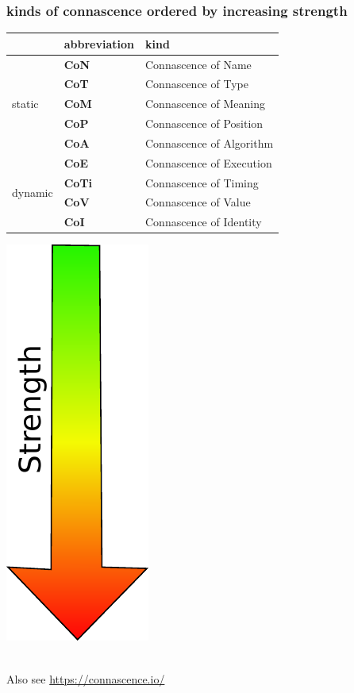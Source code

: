\documentclass[aspectratio=169,12pt,xcolor=dvipsnames]{beamer}
\begin{document}
\begin{frame}
  \frametitle{kinds of connascence ordered by increasing strength}
  \begin{center}
    \begin{minipage}[c]{.75\textwidth}
      \begin{tabular}{|l|l|l|}\hline
        & \textbf{abbreviation}  & \textbf{kind} \\\hline
        \multirow{5}{*}{static}  & \textbf{CoN}  & Connascence of Name\\
        & \textbf{CoT}  & Connascence of Type\\
        & \textbf{CoM}  & Connascence of Meaning\\
        & \textbf{CoP}  & Connascence of Position\\
        & \textbf{CoA}  & Connascence of Algorithm\\\hline
        \multirow{4}{*}{dynamic} & \textbf{CoE}  & Connascence of Execution\\
        & \textbf{CoTi} & Connascence of Timing\\
        & \textbf{CoV}  & Connascence of Value\\
        & \textbf{CoI}  & Connascence of Identity\\\hline
      \end{tabular}
    \end{minipage}
    \begin{minipage}[c]{.2\textwidth}
      \includegraphics[height=.55\textheight]{arrow}
    \end{minipage}\\\bigskip
    Also see \url{https://connascence.io/}
  \end{center}
\end{frame}
\end{document}
